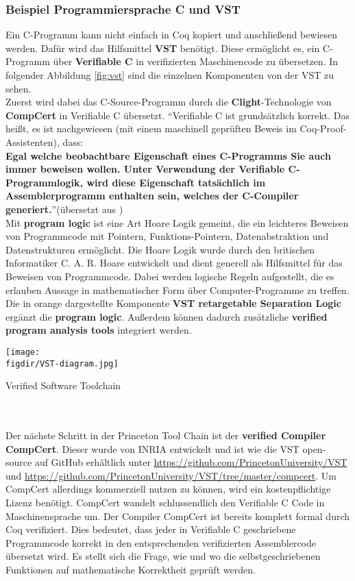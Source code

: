 \subsubsection{Beispiel Programmiersprache C und VST}
Ein C-Programm kann nicht einfach in Coq kopiert und anschließend bewiesen werden. Dafür wird das Hilfsmittel \textbf{VST} benötigt. Diese ermöglicht es, ein C-Programm über \textbf{Verifiable C} in verifizierten Maschinencode zu übersetzen.
In folgender Abbildung \ref{fig:vst} sind die einzelnen Komponenten von der VST zu sehen.\\
Zuerst wird dabei das C-Source-Programm durch die \textbf{Clight}-Technologie von \textbf{CompCert} in Verifiable C übersetzt.
"`Verifiable C ist grundsätzlich korrekt. Das heißt, es ist nachgewiesen (mit einem maschinell geprüften Beweis im Coq-Proof-Assistenten), dass:\\
\textbf{Egal welche beobachtbare Eigenschaft eines C-Programms Sie auch immer beweisen wollen. Unter Verwendung der Verifiable C-Programmlogik, wird diese Eigenschaft
	tatsächlich im Assemblerprogramm enthalten sein, welches der C-Compiler generiert.}"'(übersetzt aus \cite{Appel02:VST})\\
Mit \textbf{program logic} ist eine Art Hoare Logik gemeint, die ein leichteres Beweisen von Programmcode mit Pointern, Funktions-Pointern, Datenabstraktion und Datenstrukturen ermöglicht.\cite{Appel02:VST} Die Hoare Logik wurde durch den britischen Informatiker C. A. R. Hoare entwickelt und dient generell als Hilfsmittel für das Beweisen von Programmcode. Dabei werden logische Regeln aufgestellt, die es erlauben Aussage in mathematischer Form über Computer-Programme zu treffen.\\
Die in orange dargestellte Komponente \textbf{VST retargetable Separation Logic} ergänzt die \textbf{program logic}. Außerdem können dadurch zusätzliche \textbf{verified program analysis tools} integriert werden.\\

\begin{minipage}{\textwidth}
	\centering
	\captionsetup{type=figure}
	\texttt{[image: \\figdir/VST-diagram.jpg]}
	\caption{Verified Software Toolchain\cite{PRINCETON01:VST}}
	\label{fig:vst}
\end{minipage}
\\
\\
Der nächste Schritt in der Princeton Tool Chain ist der \textbf{verified Compiler CompCert}. Dieser wurde von INRIA entwickelt und ist wie die VST open-source auf GitHub erhältlich unter \url{https://github.com/PrincetonUniversity/VST} und \url{https://github.com/PrincetonUniversity/VST/tree/master/compcert}. Um CompCert allerdings kommerziell nutzen zu können, wird ein kostenpflichtige Lizenz benötigt.
CompCert wandelt schlussendlich den Verifiable C Code in Maschinensprache um.
Der Compiler CompCert ist bereits komplett formal durch Coq verifiziert. Dies bedeutet, dass jeder in Verifiable C geschriebene Programmcode korrekt in den entsprechenden verifizierten Assemblercode übersetzt wird. Es stellt sich die Frage, wie und wo die selbstgeschriebenen Funktionen auf mathematische Korrektheit geprüft werden.

